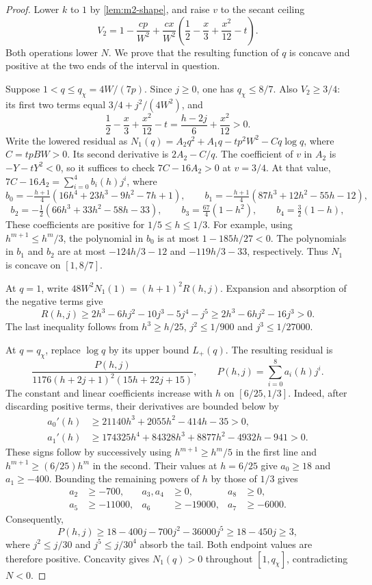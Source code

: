 \begin{proof}
Lower $k$ to $1$ by \cref{lem:m2-shape}, and raise $v$ to the secant ceiling
\[
 V_2=1-\frac{cp}{W^2}+\frac{cx}{W^2}
       \left(\frac12-\frac x3+\frac{x^2}{12}-t\right).
\]
Both operations lower $N$. We prove that the resulting function of $q$ is concave
and positive at the two ends of the interval in question.

Suppose $1<q\le q_\chi=4W/(7p)$. Since $j\ge0$, one has $q_\chi\le8/7$.
Also $V_2\ge3/4$: its first two terms equal $3/4+j^2/(4W^2)$, and
\[
 \frac12-\frac x3+\frac{x^2}{12}-t
 =\frac{h-2j}{6}+\frac{x^2}{12}>0.
\]
Write the lowered residual as
$N_1(q)=A_2q^2+A_1q-tp^2W^2-Cq\log q$, where $C=tpBW>0$.
Its second derivative is $2A_2-C/q$. The coefficient of $v$ in $A_2$ is
$-Y-tY^2<0$, so it suffices to check $7C-16A_2>0$ at $v=3/4$.
At that value, $7C-16A_2=\sum_{i=0}^4b_i(h)j^i$, where
\[
b_0=-\tfrac{h+1}4(16h^4+23h^3-9h^2-7h+1),\qquad b_1=-\tfrac{h+1}4(87h^3+12h^2-55h-12),
\]
\[
b_2=-\tfrac12(66h^3+33h^2-58h-33),\qquad b_3=\tfrac{67}4(1-h^2),\qquad b_4=\tfrac32(1-h),
\]
These coefficients are positive for $1/5\le h\le1/3$. For example, using
$h^{m+1}\le h^m/3$, the polynomial in $b_0$ is at most
$1-185h/27<0$. The polynomials in $b_1$ and $b_2$ are at most
$-124h/3-12$ and $-119h/3-33$, respectively. Thus $N_1$ is concave on $[1,8/7]$.

At $q=1$, write $48W^2N_1(1)=(h+1)^2R(h,j)$. Expansion and absorption of the
negative terms give
\[
 R(h,j)\ge2h^3-6hj^2-10j^3-5j^4-j^5
          \ge2h^3-6hj^2-16j^3>0.
\]
The last inequality follows from $h^3\ge h/25$, $j^2\le1/900$ and
$j^3\le1/27000$.

At $q=q_\chi$, replace $\log q$ by its upper bound $L_+(q)$.
The resulting residual is
\[
 \frac{P(h,j)}{1176(h+2j+1)^2(15h+22j+15)},
 \qquad P(h,j)=\sum_{i=0}^8 a_i(h)j^i.
\]
The constant and linear coefficients increase with $h$ on $[6/25,1/3]$.
Indeed, after discarding positive terms, their derivatives are bounded below by
\begin{align*}
 a_0'(h)&\ge21140h^3+2055h^2-414h-35>0,\\
 a_1'(h)&\ge174325h^4+84328h^3+8877h^2-4932h-941>0.
\end{align*}
These signs follow by successively using $h^{m+1}\ge h^m/5$ in the first line
and $h^{m+1}\ge(6/25)h^m$ in the second.
Their values at $h=6/25$ give $a_0\ge18$ and $a_1\ge-400$.
Bounding the remaining powers of $h$ by those of $1/3$ gives
\begin{align*}
 a_2&\ge-700, & a_3,a_4&\ge0, & a_8&\ge0,\\
 a_5&\ge-11000, & a_6&\ge-19000, & a_7&\ge-6000.
\end{align*}
Consequently,
\[
 P(h,j)\ge18-400j-700j^2-36000j^5
          \ge18-450j\ge3,
\]
where $j^2\le j/30$ and $j^5\le j/30^4$ absorb the tail.
Both endpoint values are therefore positive. Concavity gives $N_1(q)>0$
throughout $[1,q_\chi]$, contradicting $N<0$.
\end{proof}

